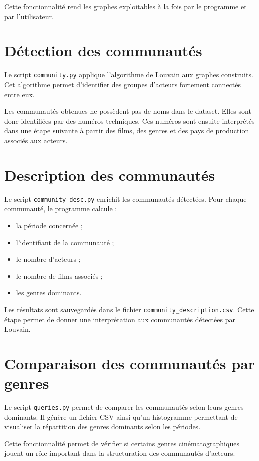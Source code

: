 \documentclass[11pt,a4paper,oneside,openany]{report}
\begin{document}
Cette fonctionnalité rend les graphes exploitables à la fois par le programme et par l’utilisateur.

\section{Détection des communautés}

Le script \texttt{community.py} applique l’algorithme de Louvain aux graphes construits. Cet algorithme permet d’identifier des groupes d’acteurs fortement connectés entre eux.

Les communautés obtenues ne possèdent pas de noms dans le dataset. Elles sont donc identifiées par des numéros techniques. Ces numéros sont ensuite interprétés dans une étape suivante à partir des films, des genres et des pays de production associés aux acteurs.

\section{Description des communautés}

Le script \texttt{community\_desc.py} enrichit les communautés détectées. Pour chaque communauté, le programme calcule :

\begin{itemize}
    \item la période concernée ;
    \item l’identifiant de la communauté ;
    \item le nombre d’acteurs ;
    \item le nombre de films associés ;
    \item les genres dominants.
\end{itemize}

Les résultats sont sauvegardés dans le fichier \texttt{community\_description.csv}. Cette étape permet de donner une interprétation aux communautés détectées par Louvain.

\section{Comparaison des communautés par genres}

Le script \texttt{queries.py} permet de comparer les communautés selon leurs genres dominants. Il génère un fichier CSV ainsi qu’un histogramme permettant de visualiser la répartition des genres dominants selon les périodes.

Cette fonctionnalité permet de vérifier si certains genres cinématographiques jouent un rôle important dans la structuration des communautés d’acteurs.
\end{document}

